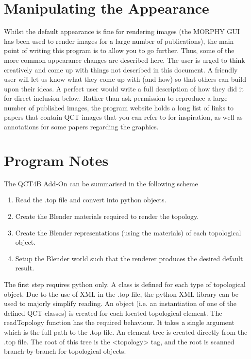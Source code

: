\documentclass{tufte-book}
\begin{document}
\chapter{Manipulating the Appearance}

Whilst the default appearance is fine for rendering images (the MORPHY GUI has been used to render images for 
a large number of publications), the main point of writing this program is to allow you to go further.
Thus, some of the more common appearance changes are described here. 
The user is urged to think creatively and come up with things not described in this document.
A friendly user will let us know what they come up with (and how) so that others can build upon their ideas.
A perfect user would write a full description of how they did it for direct inclusion below.
Rather than ask permission to reproduce a large number of published images, the program website holds a long list of links to papers that contain QCT images that you can refer to for inspiration, as well as annotations for some papers regarding the graphics.

\chapter{Program Notes}

The QCT4B Add-On can be summarised in the following scheme

\begin{enumerate}

  \item Read the .top file and convert into python objects.
  \item Create the Blender materials required to render the topology.
  \item Create the Blender representations (using the materials) of each topological object.
  \item Setup the Blender world such that the renderer produces the desired default result.

\end{enumerate}

The first step requires python only. A class is defined for each type of topological object.
Due to the use of XML in the .top file, the python XML library can be used to majorly simplify reading.
An object (i.e. an instantiation of one of the defined QCT classes) is created for each located topological element.
The readTopology function has the required behaviour. It takes a single argument which is the full path to the 
.top file.
An element tree is created directly from the .top file. The root of this tree is the <topology> tag, and the 
root is scanned branch-by-branch for topological objects.
\end{document}
